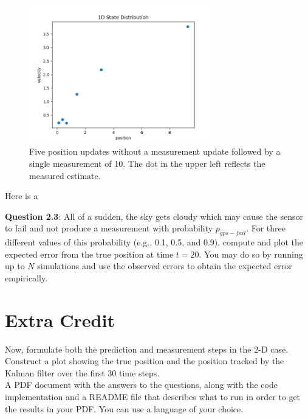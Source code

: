 \documentclass{article}
\begin{document}
\begin{figure}[h]
    \includegraphics[width=8cm]{first_measure.png}
    \centering
    \caption{Five position updates without a measurement update followed by a single measurement of 10. The dot in the upper left reflects the measured estimate.}
\end{figure}

Here is a 

{\bf Question 2.3}: All of a sudden, the sky gets cloudy which may cause the sensor to fail and not produce a measurement with probability $p_{gps-fail}$. For three different values of this probability (e.g., 0.1, 0.5, and 0.9), compute and plot the expected error from the true position at time $t = 20$. You may do so by running up to $N$ simulations and use the observed errors to obtain the expected error empirically.  

\section{Extra Credit}

Now, formulate both the prediction and measurement steps in the 2-D case. Construct a plot showing the true position and the position tracked by the Kalman filter over the first 30 time steps. \\

 A PDF document with the answers to the questions, along with the code implementation and a README file that describes what to run in order to get the results in your PDF. You can use a language of your choice. 


%
%
\end{document}
